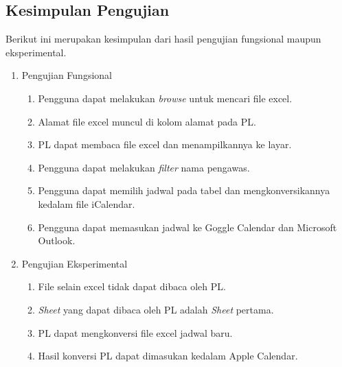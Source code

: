 	\subsection{Kesimpulan Pengujian}
	Berikut ini merupakan kesimpulan dari hasil pengujian fungsional maupun eksperimental.
	\begin{enumerate}
		\item Pengujian Fungsional
			\begin{enumerate}
				\item Pengguna dapat melakukan \textit{browse} untuk mencari file excel.
				\item Alamat file excel muncul di kolom alamat pada PL.
				\item PL dapat membaca file excel dan menampilkannya ke layar.
				\item Pengguna dapat melakukan \textit{filter} nama pengawas.
				\item Pengguna dapat memilih jadwal pada tabel dan mengkonversikannya kedalam file iCalendar.
				\item Pengguna dapat memasukan jadwal ke Goggle Calendar dan Microsoft Outlook.
			\end{enumerate}
		\item Pengujian Eksperimental
			\begin{enumerate}
				\item File selain excel tidak dapat dibaca oleh PL.
				\item \textit{Sheet} yang dapat dibaca oleh PL adalah \textit{Sheet} pertama.
				\item PL dapat mengkonversi file excel jadwal baru.
				\item Hasil konversi PL dapat dimasukan kedalam Apple Calendar.
			\end{enumerate}
	\end{enumerate}
			